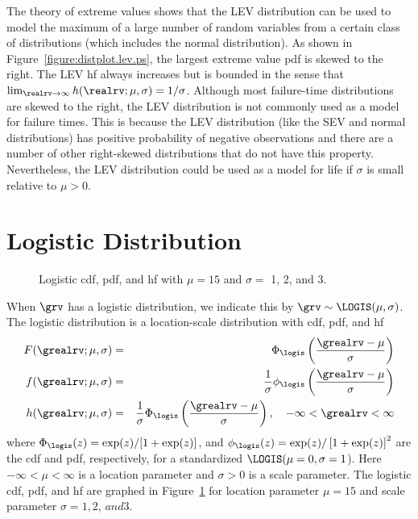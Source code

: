 The theory of extreme values shows that
the LEV distribution can be used to model the
maximum of a large number of random variables from a certain class of
distributions (which includes the normal distribution).  
As shown in Figure~\ref{figure:distplot.lev.ps}, the largest
extreme value pdf is skewed to the right.  The LEV hf
always increases but is bounded in the sense that $\lim_{\realrv
\to \infty} h(\realrv;\mu, \sigma)=1/\sigma$.  Although most
failure-time distributions are skewed to the right, the LEV
distribution is not commonly used as a model for failure times. This
is because the LEV distribution (like the SEV and normal
distributions) has positive probability of negative observations and there
are a number of other right-skewed distributions that do not have this
property.  Nevertheless, the LEV distribution could be used as a model
for life if $\sigma$ is small relative to $\mu>0$.

\section{Logistic Distribution}
\label{section:logistic.distribution.definition}

\begin{figure}
\caption{Logistic cdf, pdf, and hf with
$\mu=15$ and $\sigma=$ 1, 2, and 3.}
\label{figure:distplot.logis.ps}
\end{figure}
When $\grv$ has a logistic distribution, we indicate this by $\grv
\sim \LOGIS(\mu, \sigma)$.  The logistic distribution is a
location-scale distribution with cdf, pdf, and hf
\begin{eqnarray*}   
F(\grealrv;\mu, \sigma)&=&
\Phi_{\logis}\left (\frac{\grealrv-\mu}{\sigma}
\right )\\
 f(\grealrv;\mu, \sigma)&=&\frac{1}{ \sigma } \phi_{\logis}
\left ( 
\frac{\grealrv-\mu}{\sigma} \right) \\
h(\grealrv;\mu, \sigma)&=& \frac{1}{\sigma }\Phi_{\logis}\left (\frac{\grealrv-\mu}{\sigma}
\right ), \quad -\infty < \grealrv < \infty
 \end{eqnarray*} where $\Phi_{\logis}(z)=\exp(z)/[1+\exp(z)]$, and $\phi_{\logis}(z)=\exp(z)/\left [1+\exp(z)
\right ]^{2}$ are the cdf
and pdf, respectively, for a standardized $\LOGIS(\mu=0,
\sigma=1$). Here $-\infty< \mu < \infty$ is a location parameter and
$\sigma > 0$ is a scale parameter. The logistic cdf, pdf, and hf
are graphed in
Figure~\ref{figure:distplot.logis.ps} for location parameter $\mu=15$
and scale parameter $\sigma=1, 2$, $ and 3$.

